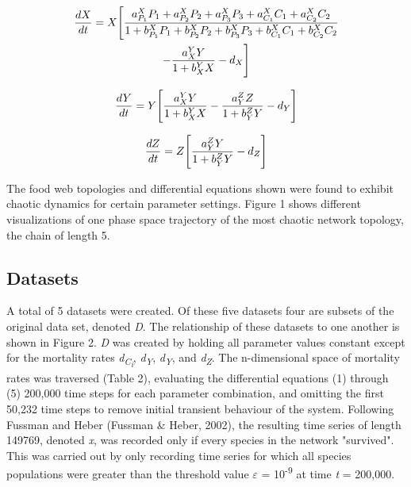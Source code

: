 \documentclass[letterpaper, 10 pt, conference]{ieeeconf}  %
\begin{document}
\begin{multline}
	\frac{dX}{dt} =
   		X\Bigg{[} 
        \frac{{a_{P_1}^{X}P_1 + a_{P_2}^{X}P_2 + a_{P_3}^{X}P_3 + a_{C_1}^{X}C_1 + a_{C_2}^{X}C_2}}{{1 + b_{P_1}^{X}P_1 + b_{P_2}^{X}P_2 + b_{P_3}^{X}P_3 + b_{C_1}^{X}C_1 + b_{C_2}^{X}C_2}} \\ 
        - \frac{a_X^YY}{1 + b_X^YX} - d_X
        \Bigg{]}
\end{multline}

\begin{equation}
	\frac{dY}{dt} =
    Y\Bigg{[}
    	\frac{a_X^YY}{1 + b_X^YX} - \frac{a_Y^ZZ}{1 + b_Y^ZY} - d_Y
    \Bigg{]}
\end{equation}

\begin{equation}
	\frac{dZ}{dt} =
    Z\Bigg{[}
    	\frac{a_Y^ZY}{1 + b_Y^ZY}  - d_Z
    \Bigg{]}
\end{equation}


The food web topologies and differential equations shown were found to exhibit chaotic dynamics for certain parameter settings. Figure 1 shows different visualizations of one phase space trajectory of the most chaotic network topology, the chain of length 5. 

\subsection{Datasets}
A total of 5 datasets were created. Of these five datasets four are subsets of the original data set, denoted \textit{D}. The relationship of these datasets to one another is shown in Figure 2. \textit{D} was created by holding all parameter values constant except for the mortality rates \textit{d\textsubscript{C\textsubscript{i}}}, \textit{d\textsubscript{Y}}, \textit{d\textsubscript{Y}}, and \textit{d\textsubscript{Z}}. The n-dimensional space of mortality rates was traversed (Table 2), evaluating the differential equations (1) through (5) 200,000 time steps for each parameter combination, and omitting the first 50,232 time steps to remove initial transient behaviour of the system. Following Fussman and Heber (Fussman \& Heber, 2002), the resulting time series of length 149769, denoted \textit{x}, was recorded only if every species in the network "survived". This was carried out by only recording time series for which all species populations were greater than the threshold value $\varepsilon$ = 10\textsuperscript{-9} at time \textit{t} = 200,000. 
\end{document}
